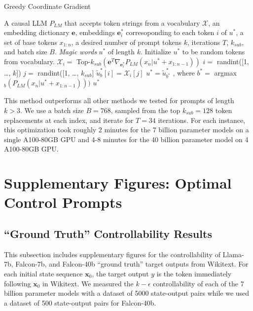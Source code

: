 \documentclass{article} %
\begin{document}
\begin{algorithm}
\label{alg:gcg}
\caption{Greedy Coordinate Gradient}
\begin{algorithmic}[1]
\Require A causal LLM $P_{LM}$ that accepts token strings from a vocabulary $\mathcal X$, an embedding dictionary $\mathbf{e}$, embeddings $\mathbf{e}^{*}_i$ corresoponding to each token $i$ of $u^*$, a set of base tokens $x_{1:n}$, a desired number of prompt tokens $k$, iterations $T$, $k_{sub}$, and batch size $B$.
\Ensure \textit{Magic words} $u^*$ of length $k$.
\State Initialize $u^*$ to be random tokens from vocabulary.
        \State $\mathcal X_i = $ Top-$k_{sub} (\mathbf{e}^T \nabla_{\mathbf{e}^{*}_i} P_{LM}(x_n | u^* + x_{1:n-1}))$ \label{line:cand_calc}
    \EndFor
     \label{line:for_batch}
        \State $i = $ randint([1, \dots, $k$])
        \State $j = $ randint([1, \dots, $k_{sub}$]
        \State $\tilde{u}^{*}_b [i] = \mathcal X_i [j]$ 
    \EndFor
    \State $u^{*} = \tilde{u}^{*}_{b^\ast}$ , where $b^\ast = $ argmax$_b (P_{LM}(x_n | u^* + x_{1:n-1})))$
\EndFor
\State \Return $u^*$
\end{algorithmic}
\end{algorithm}

This method outperforms all other methods we tested for prompts of length $k>3$. We use a batch size $B=768$, sampled from the top $k_{sub}=128$ token replacements at each index, and iterate for $T=34$ iterations. 
For each instance, this optimization took roughly 2 minutes for the 7 billion parameter models on a single A100-80GB GPU and 4-8 minutes for the 40 billion parameter model on 4 A100-80GB GPU.






\newpage
\section{Supplementary Figures: Optimal Control Prompts}
\label{sec:sup_figs}

\subsection{``Ground Truth'' Controllability Results}
\label{sec:sup_main}
This subsection includes supplementary figures for the controllability of Llama-7b, Falcon-7b, and Falcon-40b ``ground truth'' target outputs from Wikitext. For each initial state sequence $\mathbf x_0$, the target output $y$ is the token immediately following $\mathbf x_0$ in Wikitext. 
We measured the $k-\epsilon$ controllability of each of the 7 billion parameter models with a dataset of 5000 state-output pairs while we used a dataset of 500 state-output pairs for Falcon-40b. 
\end{document}
